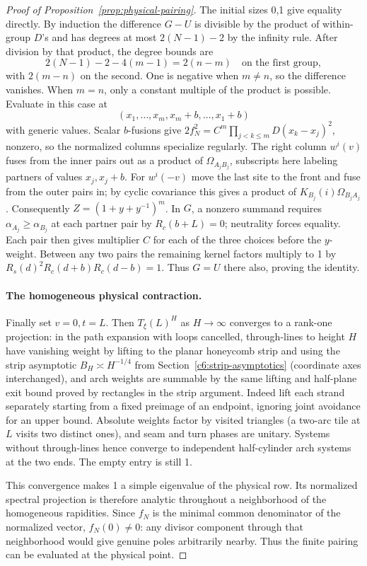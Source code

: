 \begin{proof}[Proof of Proposition~\ref{prop:physical-pairing}]
The initial sizes 0,1 give equality directly. By induction the difference \(G-U\) is divisible by the product of within-group \(D\)'s and has degrees at most \(2(N-1)-2\) by the infinity rule. After division by that product, the degree bounds are
\[
 2(N-1)-2-4(m-1)=2(n-m)\quad\text{on the first group},
\]
with \(2(m-n)\) on the second. One is negative when \(m\ne n\), so the difference vanishes. When \(m=n\), only a constant multiple of the product is possible. Evaluate in this case at
\[
 (x_1,\ldots,x_m,x_m+b,\ldots,x_1+b)
\]
with generic values. Scalar \(b\)-fusions give \(2 f_N^2=C^m\prod_{j<k\le m} D(x_k-x_j)^2\), nonzero, so the normalized columns specialize regularly. The right column \(w^i(v)\) fuses from the inner pairs out as a product of \(\Omega_{A_j B_j}\), subscripts here labeling partners of values \(x_j,x_j+b\). For \(w^i(-v)\) move the last site to the front and fuse from the outer pairs in; by cyclic covariance this gives a product of \(K_{B_j}(i)\Omega_{B_j A_j}\). Consequently \(Z=(1+y+y^{-1})^m\). In \(G\), a nonzero summand requires \(\alpha_{A_j}\ge\alpha_{B_j}\) at each partner pair by \(R_c(b+L)=0\); neutrality forces equality. Each pair then gives multiplier \(C\) for each of the three choices before the \(y\)-weight. Between any two pairs the remaining kernel factors multiply to 1 by \(R_s(d)^2 R_c(d+b)R_c(d-b)=1\). Thus \(G=U\) there also, proving the identity.

\paragraph{The homogeneous physical contraction.}
Finally set \(v=0,t=L\). Then \(T_\xi(L)^H\) as \(H\to\infty\) converges to a rank-one projection: in the path expansion with loops cancelled, through-lines to height \(H\) have vanishing weight by lifting to the planar honeycomb strip and using the strip asymptotic \(B_H\asymp H^{-1/4}\) from Section~\ref{c6:strip-asymptotics} (coordinate axes interchanged), and arch weights are summable by the same lifting and half-plane exit bound proved by rectangles in the strip argument. Indeed lift each strand separately starting from a fixed preimage of an endpoint, ignoring joint avoidance for an upper bound. Absolute weights factor by visited triangles (a two-arc tile at \(L\) visits two distinct ones), and seam and turn phases are unitary. Systems without through-lines hence converge to independent half-cylinder arch systems at the two ends. The empty entry is still 1.

This convergence makes 1 a simple eigenvalue of the physical row. Its normalized spectral projection is therefore analytic throughout a neighborhood of the homogeneous rapidities. Since \(f_N\) is the minimal common denominator of the normalized vector, \(f_N(0)\ne0\): any divisor component through that neighborhood would give genuine poles arbitrarily nearby. Thus the finite pairing can be evaluated at the physical point.


\end{proof}
